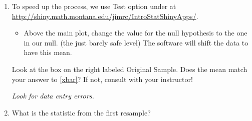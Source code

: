\begin{enumerate}
\begin{enumerate}





\end{enumerate}
\item To speed up the process, we use  {\sf Test} option under
   at
  \url{http://shiny.math.montana.edu/jimrc/IntroStatShinyApps/}. 

  \begin{itemize}
    \item Above the main plot, change the value for the null
      hypothesis to the one in our null.  (the just barely safe level)
      The software will shift the data to have this mean.
   \end{itemize}

    Look at the box on the right labeled {\sf Original Sample}.
       Does the mean match your answer to \ref{xbar}?  If not, consult
       with your instructor! 
\begin{students}
  \vspace{1cm}
\end{students}

\begin{key}
  {\it Look for data entry errors. }
\end{key}

\item   What is the statistic from the first  resample?
\begin{students}
  \vspace{1cm}
\end{students}


\end{enumerate}
